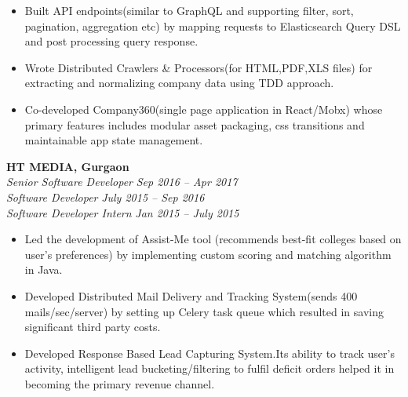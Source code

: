 \documentclass[margin,line]{resume}
\begin{document}
\begin{resume}
\begin{itemize}
            \item Built API endpoints(similar to GraphQL and supporting filter, sort, pagination, aggregation etc) by mapping requests to Elasticsearch Query DSL and post processing query response.
            \item Wrote Distributed Crawlers \& Processors(for HTML,PDF,XLS files) for extracting and normalizing company data using TDD approach.
           \item Co-developed Company360(single page application in React/Mobx) whose primary features includes modular asset packaging, css transitions and maintainable app state management.
        \end{itemize}

    \textbf{HT MEDIA, Gurgaon}\\
           \textsl{Senior Software Developer} \hfill \textsl{Sep 2016 -- Apr 2017} \vspace{0mm}\\\vspace{0mm}%
           \textsl{Software Developer} \hfill \textsl{July 2015 -- Sep 2016} \vspace{0mm}\\\vspace{0mm}%
           \textsl{Software Developer Intern} \hfill \textsl{Jan 2015 -- July 2015} \vspace{1mm}%
    \begin{itemize}
            \item Led the development of Assist-Me tool (recommends best-fit colleges based on user's preferences) by implementing custom scoring and matching algorithm in Java.
            \item Developed Distributed Mail Delivery and Tracking System(sends 400 mails/sec/server) by setting up Celery task queue which resulted in saving significant third party costs.
            \item Developed Response Based Lead Capturing System.Its ability to track user's activity, intelligent lead bucketing/filtering to fulfil deficit orders helped it in becoming the primary revenue channel.


\end{itemize}
\end{resume}
\end{document}
